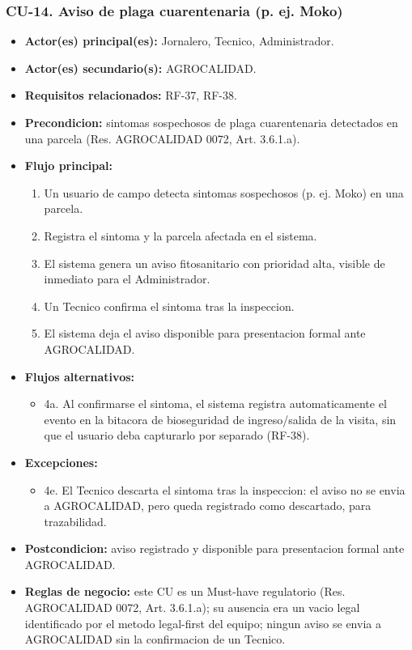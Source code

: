 \documentclass[11pt,a4paper]{article}
\begin{document}
\subsubsection{CU-14. Aviso de plaga cuarentenaria (p. ej. Moko)}
\begin{itemize}
\item \textbf{Actor(es) principal(es):} Jornalero, Tecnico, Administrador.
\item \textbf{Actor(es) secundario(s):} AGROCALIDAD.
\item \textbf{Requisitos relacionados:} RF-37, RF-38.
\item \textbf{Precondicion:} sintomas sospechosos de plaga cuarentenaria detectados en una parcela (Res. AGROCALIDAD 0072, Art. 3.6.1.a).
\item \textbf{Flujo principal:}
  \begin{enumerate}
  \item Un usuario de campo detecta sintomas sospechosos (p. ej. Moko) en una parcela.
  \item Registra el sintoma y la parcela afectada en el sistema.
  \item El sistema genera un aviso fitosanitario con prioridad alta, visible de inmediato para el Administrador.
  \item Un Tecnico confirma el sintoma tras la inspeccion.
  \item El sistema deja el aviso disponible para presentacion formal ante AGROCALIDAD.
  \end{enumerate}
\item \textbf{Flujos alternativos:}
  \begin{itemize}
  \item 4a. Al confirmarse el sintoma, el sistema registra automaticamente el evento en la bitacora de bioseguridad de ingreso/salida de la visita, sin que el usuario deba capturarlo por separado (RF-38).
  \end{itemize}
\item \textbf{Excepciones:}
  \begin{itemize}
  \item 4e. El Tecnico descarta el sintoma tras la inspeccion: el aviso no se envia a AGROCALIDAD, pero queda registrado como descartado, para trazabilidad.
  \end{itemize}
\item \textbf{Postcondicion:} aviso registrado y disponible para presentacion formal ante AGROCALIDAD.
\item \textbf{Reglas de negocio:} este CU es un Must-have regulatorio (Res. AGROCALIDAD 0072, Art. 3.6.1.a); su ausencia era un vacio legal identificado por el metodo legal-first del equipo; ningun aviso se envia a AGROCALIDAD sin la confirmacion de un Tecnico.
\end{itemize}
\end{document}
